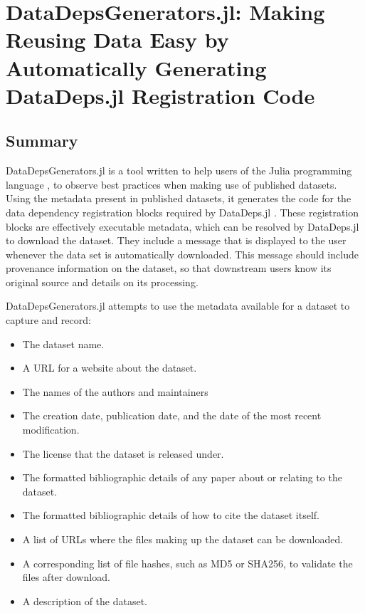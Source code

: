 \documentclass{book}
\begin{document}
\chapter{DataDepsGenerators.jl: Making Reusing Data Easy by Automatically Generating DataDeps.jl Registration Code}

\section{Summary}

DataDepsGenerators.jl is a tool written to help users of the Julia
programming language \citep{Julia}, to observe best practices when
making use of published datasets. Using the metadata present in
published datasets, it generates the code for the data dependency
registration blocks required by DataDeps.jl
\citep{2018arXiv180801091W}. These registration blocks are effectively
executable metadata, which can be resolved by DataDeps.jl to download
the dataset. They include a message that is displayed to the user
whenever the data set is automatically downloaded. This message should
include provenance information on the dataset, so that downstream users
know its original source and details on its processing.

DataDepsGenerators.jl attempts to use the metadata available for a
dataset to capture and record:

\begin{itemize}
	
	\item
	The dataset name.
	\item
	A URL for a website about the dataset.
	\item
	The names of the authors and maintainers
	\item
	The creation date, publication date, and the date of the most recent
	modification.
	\item
	The license that the dataset is released under.
	\item
	The formatted bibliographic details of any paper about or relating to
	the dataset.
	\item
	The formatted bibliographic details of how to cite the dataset itself.
	\item
	A list of URLs where the files making up the dataset can be
	downloaded.
	\item
	A corresponding list of file hashes, such as MD5 or SHA256, to
	validate the files after download.
	\item
	A description of the dataset.
\end{itemize}
\end{document}
